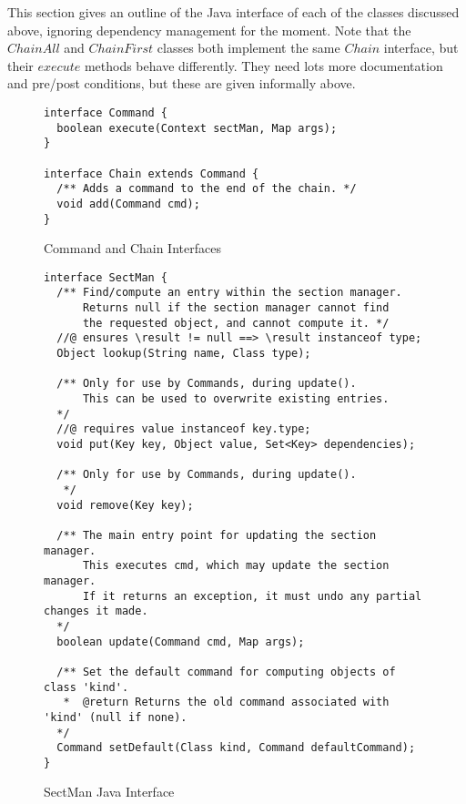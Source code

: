 \documentclass{llncs} %
\begin{document}
This section gives an outline of the Java interface of each of the classes
discussed above, ignoring dependency management for the moment.
Note that the $ChainAll$ and $ChainFirst$ classes both implement the
same $Chain$ interface, but their $execute$ methods behave differently.
They need lots more documentation and pre/post conditions, but these are
given informally above. 

\begin{figure}[htbp]
  \centering
\begin{small}
\begin{verbatim}
interface Command {
  boolean execute(Context sectMan, Map args);
}

interface Chain extends Command {
  /** Adds a command to the end of the chain. */
  void add(Command cmd);
}
\end{verbatim}
\end{small}
  \caption{Command and Chain Interfaces}
  \label{fig:command}
\end{figure}

\begin{figure}[htbp]
  \centering
\begin{small}
\begin{verbatim}
interface SectMan {
  /** Find/compute an entry within the section manager.
      Returns null if the section manager cannot find
      the requested object, and cannot compute it. */ 
  //@ ensures \result != null ==> \result instanceof type;
  Object lookup(String name, Class type);

  /** Only for use by Commands, during update().
      This can be used to overwrite existing entries.
  */
  //@ requires value instanceof key.type;
  void put(Key key, Object value, Set<Key> dependencies);

  /** Only for use by Commands, during update().
   */
  void remove(Key key);

  /** The main entry point for updating the section manager.
      This executes cmd, which may update the section manager.
      If it returns an exception, it must undo any partial changes it made.
  */
  boolean update(Command cmd, Map args);

  /** Set the default command for computing objects of class 'kind'.
   *  @return Returns the old command associated with 'kind' (null if none).
  */
  Command setDefault(Class kind, Command defaultCommand);
}
\end{verbatim}
\end{small}
  \caption{SectMan Java Interface}
  \label{fig:sectman}
\end{figure}
\end{document}
